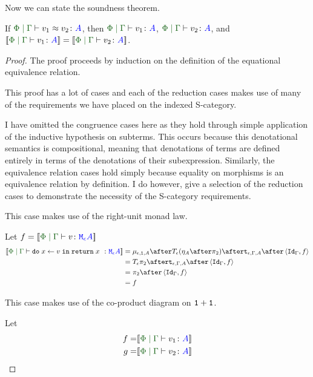 \documentclass{Report}
\begin{document}
Now we can state the soundness theorem. 

\begin{theorem}[Soundness]
    If $\gpeberelation{v_1}{v_2}{A}$, then $\gpetyperelation{v_1}{A}$, $\gpetyperelation{v_2}{A}$, and $\deno{\gpetyperelation{v_1}{A}} = \deno{\gpetyperelation{v_2}{A}}$.
\end{theorem}


\begin{proof}
    The proof proceeds by induction on the definition of the equational equivalence relation.

    This proof has a lot of cases and each of the reduction cases makes use of many of the requirements we have placed on the indexed S-category.

    I have omitted the congruence cases here as they hold through simple application of the inductive hypothesis on subterms. This occurs because this denotational semantics is compositional, meaning that denotations of terms are defined entirely in terms of the denotations of their subexpression. Similarly, the equivalence relation cases hold simply because equality on morphisms is an equivalence relation by definition. I do however, give a selection of the reduction cases to demonstrate the necessity of the S-category requirements.

This case makes use of the right-unit monad law.

Let $f = \deno{\gpetyperelation{v}{\mea}}$ 
    \begin{equation}
    \begin{split}
        \deno{\gpetyperelation{\doin{x}{v}{\return{x}}}{\mea}}  & = \bind{\e}{\1}{A} \after \T{\e}{(\point{A} \after \pp)} \after \tstrength{\e}{\G}{A}\after \pr{\idg}{f} \\
        & = \T{\e}{\pp} \after \tstrength{\e}{\G}{A} \after \pr {\idg}{f} \\
        & = \pp \after \pr{\idg}{f}\\
        & = f
    \end{split}
\end{equation}

This case makes use of the co-product diagram on $\texttt{1} + \texttt{1}$.

Let
\begin{align*}
    f = &\deno{\gpetyperelation{v_1}{A}}\\
    g = &\deno{\gpetyperelation{v_2}{A}}\\
\end{align*}


\end{proof}
\end{document}

